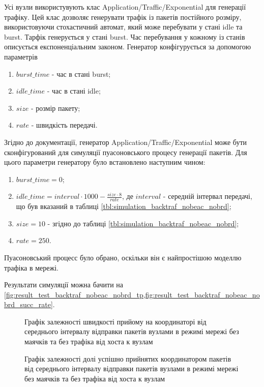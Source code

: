 \documentclass[a4paper,ukrainian,utf8,nocolumnsxix,floatsection,equationsection]{eskdtext}
\newcommand{\longcaption}[1]{\captionsetup{style=figureLongCaption}\caption{#1}}
\begin{document}
Усі вузли використувують клас Application/Traffic/Exponential для генерації трафіку. Цей клас дозволяє генерувати трафік із пакетів постійного розміру, використовуючи стохастичний автомат, який може перебувати у стані idle та burst. Тарфік генерується у стані burst. Час перебування у кожному із станів описується експоненціальним законом. Генератор конфігурується за допомогою параметрів 
\begin{enumerate}
	\item $burst\_time$ - час в стані burst;
	\item $idle\_time$ - час в стані idle;
	\item $size$ - розмір пакету;
	\item $rate$ - швидкість передачі.
\end{enumerate}

Згідно до документації, генератор Application/Traffic/Exponential може бути сконфігурований для симуляції пуасоновського процесу генерації пакетів. Для цього параметри генератору було встановлено наступним чином:
\begin{enumerate}
	\item $burst\_time = 0$;
	\item $idle\_time = interval\cdot1000 - \frac{size \cdot 8}{rate}$, де $interval$ - середній інтервал передачі, що був вказаний в таблиці \ref{tbl:simulation_backtraf_nobeac_nobrd};
	\item $size = 10$ - згідно до таблиці \ref{tbl:simulation_backtraf_nobeac_nobrd};
	\item $rate = 250$.
\end{enumerate}

Пуасоновський процесс було обрано, оскільки він є найпростішою моделлю трафіка в мережі.

Результати симуляції можна бачити на \cref{fig:result_test_backtraf_nobeac_nobrd_tp,fig:result_test_backtraf_nobeac_nobrd_succ_rate}.

\begin{figure}[htbp]
	\centering
	\longcaption{\label{fig:result_test_backtraf_nobeac_nobrd_tp}Графік залежності швидкості прийому на координаторі від середнього інтервалу відправки пакетів вузлами в режимі мережі без маячків та без трафіка від хоста к вузлам}
\end{figure}

\begin{figure}[htbp]
	\centering
	\longcaption{\label{fig:result_test_backtraf_nobeac_nobrd_succ_rate}Графік залежності долі успішно прийнятих координатором пакетів від середнього інтервалу відправки пакетів вузлами в режимі мережі без маячків та без трафіка від хоста к вузлам}
\end{figure}
\end{document}
